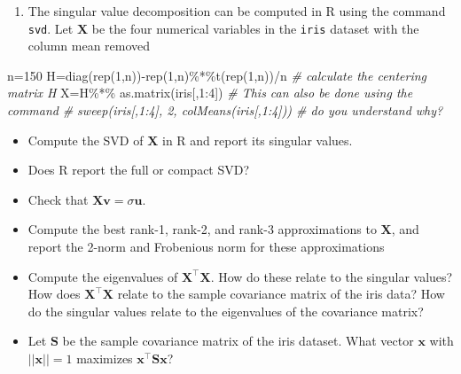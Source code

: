 \documentclass[
]{book}
\newenvironment{Shaded}{\begin{snugshade}}{\end{snugshade}}
\newcommand{\CommentTok}[1]{\textcolor[rgb]{0.56,0.35,0.01}{\textit{#1}}}
\newcommand{\DecValTok}[1]{\textcolor[rgb]{0.00,0.00,0.81}{#1}}
\newcommand{\FunctionTok}[1]{\textcolor[rgb]{0.00,0.00,0.00}{#1}}
\newcommand{\NormalTok}[1]{#1}
\newcommand{\OtherTok}[1]{\textcolor[rgb]{0.56,0.35,0.01}{#1}}
\newcommand{\SpecialCharTok}[1]{\textcolor[rgb]{0.00,0.00,0.00}{#1}}
\providecommand{\tightlist}{%
  \setlength{\itemsep}{0pt}\setlength{\parskip}{0pt}}
\theoremstyle{definition}
\theoremstyle{definition}
\theoremstyle{definition}
\theoremstyle{definition}
\theoremstyle{remark}
\begin{document}
\begin{enumerate}
\def\labelenumi{\arabic{enumi}.}
\setcounter{enumi}{1}
\tightlist
\item
  The singular value decomposition can be computed in R using the command \texttt{svd}. Let \(\mathbf X\) be the four numerical variables in the \texttt{iris} dataset with the column mean removed
\end{enumerate}

\begin{Shaded}
\begin{Highlighting}[]
\NormalTok{n}\OtherTok{=}\DecValTok{150}
\NormalTok{H}\OtherTok{=}\FunctionTok{diag}\NormalTok{(}\FunctionTok{rep}\NormalTok{(}\DecValTok{1}\NormalTok{,n))}\SpecialCharTok{{-}}\FunctionTok{rep}\NormalTok{(}\DecValTok{1}\NormalTok{,n)}\SpecialCharTok{\%*\%}\FunctionTok{t}\NormalTok{(}\FunctionTok{rep}\NormalTok{(}\DecValTok{1}\NormalTok{,n))}\SpecialCharTok{/}\NormalTok{n   }\CommentTok{\# calculate the centering matrix H}
\NormalTok{X}\OtherTok{=}\NormalTok{H}\SpecialCharTok{\%*\%} \FunctionTok{as.matrix}\NormalTok{(iris[,}\DecValTok{1}\SpecialCharTok{:}\DecValTok{4}\NormalTok{])}
\CommentTok{\# This can also be done using the command}
\CommentTok{\# sweep(iris[,1:4], 2, colMeans(iris[,1:4]))  \# do you understand why?}
\end{Highlighting}
\end{Shaded}

\begin{itemize}
\item
  Compute the SVD of \(\mathbf X\) in R and report its singular values.
\item
  Does R report the full or compact SVD?
\item
  Check that \(\mathbf X\mathbf v= \sigma \mathbf u\).
\item
  Compute the best rank-1, rank-2, and rank-3 approximations to \(\mathbf X\), and report the 2-norm and Frobenious norm for these approximations
\item
  Compute the eigenvalues of \(\mathbf X^\top \mathbf X\). How do these relate to the singular values? How does \(\mathbf X^\top \mathbf X\) relate to the sample covariance matrix of the iris data? How do the singular values relate to the eigenvalues of the covariance matrix?
\item
  Let \(\mathbf S\) be the sample covariance matrix of the iris dataset. What vector \(\mathbf x\) with \(||\mathbf x||=1\) maximizes \(\mathbf x^\top \mathbf S\mathbf x\)?
\end{itemize}
\end{document}
